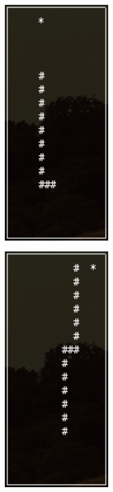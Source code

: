 \documentclass[12pt]{article}
\begin{document}
\begin{figure}[ht]
\centering
\begin{subfigure}{0.4\textwidth}
\centering
\includegraphics[width=0.5\textwidth]{Figures/game_board_1}
\label{fig:game_board_1}
\end{subfigure}%
\begin{subfigure}{0.4\textwidth}
\centering
\includegraphics[width=0.5\textwidth]{Figures/game_board_2}
\label{fig:game_board_2}
\end{subfigure}


\end{figure}
\end{document}
